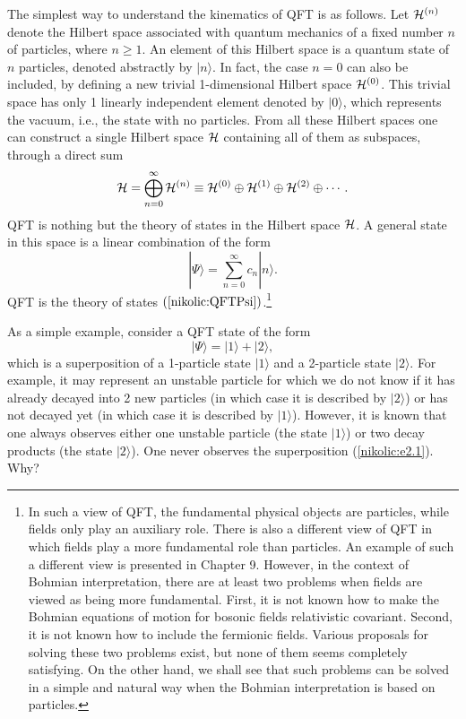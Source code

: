 \documentclass[12pt,twoside]{report} %
\begin{document}
The simplest way to understand the kinematics of QFT is as follows.
Let ${\cal H}^{(n)}$ denote the Hilbert space associated with quantum mechanics
of a fixed number $n$ of particles, where $n\geq 1$. 
An element of this Hilbert space is a quantum state of $n$ particles, denoted
abstractly by $|n\rangle$.
In fact, the case $n=0$ can also be included, by defining a new
trivial 1-dimensional Hilbert space ${\cal H}^{(0)}$. This trivial space has only
1 linearly independent element denoted by $|0\rangle$, which represents
the vacuum, i.e., the state with no particles. From all these Hilbert spaces
one can construct a single Hilbert space ${\cal H}$ containing all of them
as subspaces, through a direct sum
\begin{equation}
 {\cal H}=\bigoplus_{n=0}^{\infty}{\cal H}^{(n)}
\equiv {\cal H}^{(0)} \oplus {\cal H}^{(1)} \oplus {\cal H}^{(2)} \oplus \cdots .
\end{equation}
QFT is nothing but the theory of states in the Hilbert space ${\cal H}$.
A general state in this space is a linear combination of the form
 \begin{equation}\label{nikolic:QFTPsi}
  |\Psi\rangle = \sum_{n=0}^{\infty} c_n |n\rangle .
 \end{equation}
QFT is the theory of states $(\ref{nikolic:QFTPsi})$.\footnote{In such a view of QFT, 
the fundamental physical objects are particles, while fields only play an auxiliary role.
There is also a different view of QFT in which fields play a more fundamental role
than particles.
An example of such a different view is presented in Chapter 9. However, in the context of 
Bohmian interpretation, there are at least two problems when fields are viewed 
as being more fundamental.
First, it is not known how to make the Bohmian equations of motion for 
bosonic fields relativistic covariant.
Second, it is not known how to include the fermionic fields. Various proposals
for solving these two problems exist, but none of them seems completely satisfying.
On the other hand, 
we shall see that such problems can be solved in a 
simple and natural way when the Bohmian interpretation
is based on particles.} 

As a simple example, consider a QFT state of the form 
\begin{equation}\label{nikolic:e2.1}
|\Psi\rangle = |1\rangle + |2\rangle ,
\end{equation}
which is a superposition of a 1-particle state $|1\rangle$ and a 2-particle state
$|2\rangle$. For example, it may represent an unstable particle for which 
we do not know if it has already decayed into 2 new particles (in which case it is
described by $|2\rangle$) or has not decayed yet (in which case it is
described by $|1\rangle$). However, it is known that
one always observes either one unstable particle
(the state $|1\rangle$) or two decay products (the state $|2\rangle$). One never 
observes the superposition (\ref{nikolic:e2.1}). Why?
\end{document}
